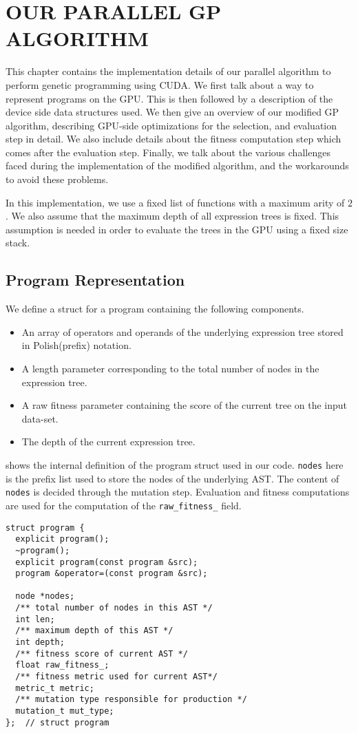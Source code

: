 \chapter{OUR PARALLEL GP ALGORITHM}
\label{chap:ourwork}
This chapter contains the implementation details of our parallel algorithm to perform genetic programming using CUDA. We first talk about a way to represent programs on the GPU. This is then followed by a description of the device side data structures used. We then give an overview of our modified GP algorithm, describing GPU-side optimizations for the selection, and evaluation step in detail. We also include details about the fitness computation step which comes after the evaluation step. Finally, we talk about the various challenges faced during the implementation of the modified algorithm, and the workarounds to avoid these problems.

In this implementation, we use a fixed list of functions with a maximum arity of $2$. We also assume that the maximum depth of all expression trees is fixed. This assumption is needed in order to evaluate the trees in the GPU using a fixed size stack.

\section{Program Representation}
\label{ow:input}
We define a struct for a program containing the following components. 
\begin{itemize}
  \item An array of operators and operands of the underlying expression tree stored in Polish(prefix) notation.
  \item A length parameter corresponding to the total number of nodes in the expression tree. 
  \item A raw fitness parameter containing the score of the current tree on the input data-set. 
  \item The depth of the current expression tree. 
\end{itemize}

 shows the internal definition of the program struct used in our code. \lstinline!nodes! here is the prefix list used to store the nodes of the underlying AST. The content of \lstinline!nodes! is decided through the mutation step. Evaluation and fitness computations are used for the computation of the \lstinline!raw_fitness_! field.

\begin{lstlisting}[caption={Our code for the program struct, representing a single expression tree. This entire structure is copied over and evaluated on the GPU.},label={lst:programstruct}]
struct program {
  explicit program();
  ~program();
  explicit program(const program &src);
  program &operator=(const program &src);

  node *nodes;
  /** total number of nodes in this AST */
  int len;
  /** maximum depth of this AST */
  int depth;
  /** fitness score of current AST */
  float raw_fitness_;
  /** fitness metric used for current AST*/
  metric_t metric;
  /** mutation type responsible for production */
  mutation_t mut_type;
};  // struct program
\end{lstlisting}

